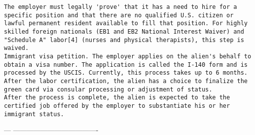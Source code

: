 \documentclass[oneside, article]{memoir}
\begin{document}
\begin{verbatim}
The employer must legally 'prove' that it has a need to hire for a specific position and that there are no qualified U.S. citizen or lawful permanent resident available to fill that position. For highly skilled foreign nationals (EB1 and EB2 National Interest Waiver) and "Schedule A" labor[4] (nurses and physical therapists), this step is waived.
Immigrant visa petition. The employer applies on the alien's behalf to obtain a visa number. The application is called the I-140 form and is processed by the USCIS. Currently, this process takes up to 6 months.
After the labor certification, the alien has a choice to finalize the green card via consular processing or adjustment of status.
After the process is complete, the alien is expected to take the certified job offered by the employer to substantiate his or her immigrant status.

\end{verbatim}
---
-------------------------------------
\end{document}
